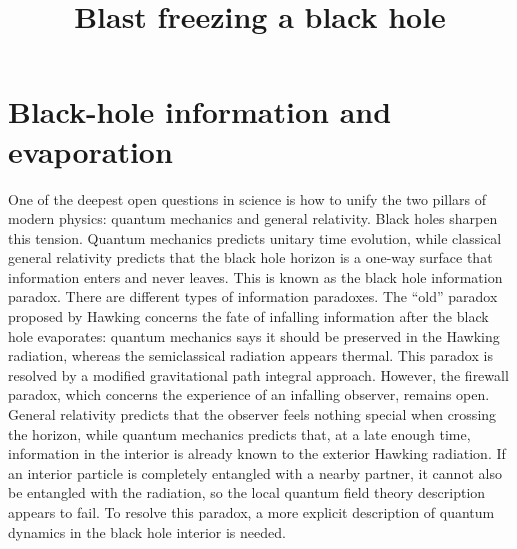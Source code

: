 \documentclass[pdflatex,sn-nature]{sn-jnl}
\begin{document}
\title{Blast freezing a black hole}
\author*[1]{ }
\author*[1,2]{ }
\maketitle

\section{Black-hole information and evaporation}

One of the deepest open questions in science is how to unify the two pillars of modern physics: quantum mechanics and general relativity. Black holes sharpen this tension. Quantum mechanics predicts unitary time evolution, while classical general relativity predicts that the black hole horizon is a one-way surface that information enters and never leaves. This is known as the black hole information paradox. There are different types of information paradoxes. The ``old'' paradox proposed by Hawking\cite{hawking1976breakdown} concerns the fate of infalling information after the black hole evaporates: quantum mechanics says it should be preserved in the Hawking radiation, whereas the semiclassical radiation appears thermal. This paradox is resolved by a modified gravitational path integral approach\cite{penington2020entanglement,penington2022replica,almheiri2019entropy,almheiri2020replica}. However, the firewall paradox\cite{almheiri2013black,almheiri2013apologia}, which concerns the experience of an infalling observer, remains open. General relativity predicts that the observer feels nothing special when crossing the horizon, while quantum mechanics predicts that, at a late enough time, information in the interior is already known to the exterior Hawking radiation. If an interior particle is completely entangled with a nearby partner, it cannot also be entangled with the radiation, so the local quantum field theory description appears to fail. To resolve this paradox, a more explicit description of quantum dynamics in the black hole interior is needed.
\end{document}
